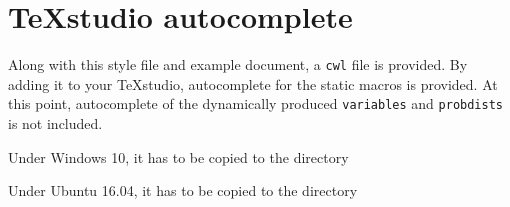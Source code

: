 \documentclass
[
twoside, %
]
{article}
\begin{document}
\section{\TeX studio autocomplete}
Along with this style file and example document, a \texttt{cwl} file is provided. By adding it to your \TeX studio, autocomplete for the static macros is provided. At this point, autocomplete of the dynamically produced \texttt{variables} and \texttt{probdists} is not included.

Under Windows 10, it has to be copied to the directory  

Under Ubuntu 16.04, it has to be copied to the directory  
\end{document}
